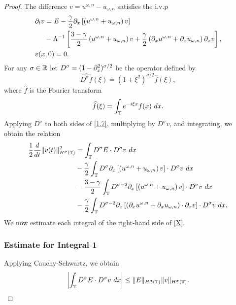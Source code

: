 \begin{proof} The difference $v = u^{\omega,n} - u_{\omega,n}$ satisfies 
the i.v.p
\begin{align}
\label{1.7}
& \p_t v  =  E - \frac{\gamma}{2} \p_x
\left[ \left( u^{\omega,n} + u_{\omega,n} \right)v \right]
\\
\notag & \phantom{\p_t v} - \Lambda^{-1} \left[
\frac{3-\gamma}{2} \left( u^{\omega,n} + u_{\omega,n}
\right) v +
\frac{\gamma}{2}\left( \p_x u^{\omega,n} +
\p_x u_{\omega,n}
\right) \p_x v
\right], \\
& v(x,0)=0.
\end{align}
For any $\sigma \in \mathbb{R}$ let   $D^\sigma=(1-\partial_x^2)^{\sigma/2}$ be the  operator
defined by 
%
$$ \widehat{D^\sigma f}(\xi) \doteq (1 + \xi^2)^{\sigma/2} \widehat{f}(\xi), $$
%
where $ \widehat{f}$ is the Fourier transform
%
$$ \widehat{f}(\xi) =  \int_{\mathbb{T}} e^{-i \xi x} f(x) \ dx.  $$
%
%
Applying $D^\sigma$ to both sides of \eqref{1.7}, multiplying by
$D^\sigma v$, and integrating, we obtain the
relation
%
%
\begin{equation}
\begin{split}
\frac{1}{2}\frac{d}{dt}\|v(t)\|_{H^\sigma(\mathbb{T})}^2
& = \int_{\mathbb{T}} D^\sigma E \cdot D^\sigma
v \ dx
\\
&-
\frac{\gamma}{2}\int_{\mathbb{T}} D^\sigma
\partial_x \left[ \left( u^{\omega,n} + u_{\omega,n} \right)v
\right]\cdot D^\sigma v \ dx
\\
& -
\frac{3-\gamma}{2}\int_{\mathbb{T}} D^{\sigma
-2} \partial_x \left[ \left( u^{\omega,n} + u_{\omega,n}
\right)v \right] \cdot D^\sigma v \ dx
\\
& - \frac{\gamma}{2}\int_{\mathbb{T}} D^{\sigma
-2}
\partial_x \left[ \left( \partial_x u^{\omega,n} + \partial_x u_{\omega,n}
\right)\cdot \partial_x v \right] \cdot
D^\sigma v \ dx.
\label{X}
\end{split}
\end{equation}
%
%
We now estimate each integral of the right-hand side
of \eqref{X}.
\subsubsection{Estimate for Integral 1} Applying Cauchy-Schwartz, we obtain
%
%
\begin{equation}
\begin{split}
\left |\int_{\mathbb{T}} D^\sigma E \cdot D^\sigma v \ dx \right |
\le \|E\|_{H^\sigma(\mathbb{T})} \|v\|_{H^\sigma(\mathbb{T})}.
\label{est_for_1}
\end{split}
\end{equation}
%
%
%

\end{proof}
